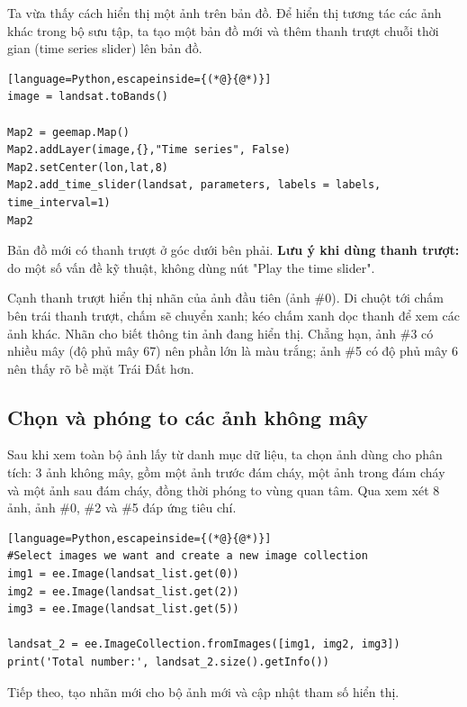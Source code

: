 Ta vừa thấy cách hiển thị một ảnh trên bản đồ. Để hiển thị tương tác các ảnh khác trong bộ sưu tập, ta tạo một bản đồ mới và thêm thanh trượt chuỗi thời gian (time series slider) lên bản đồ.

\begin{lstlisting}[language=Python,escapeinside={(*@}{@*)}]
image = landsat.toBands()

Map2 = geemap.Map()
Map2.addLayer(image,{},"Time series", False)
Map2.setCenter(lon,lat,8)
Map2.add_time_slider(landsat, parameters, labels = labels, time_interval=1)
Map2
\end{lstlisting}

Bản đồ mới có thanh trượt ở góc dưới bên phải. \textbf{Lưu ý khi dùng thanh trượt:} do một số vấn đề kỹ thuật, không dùng nút "Play the time slider".

Cạnh thanh trượt hiển thị nhãn của ảnh đầu tiên (ảnh \#0). Di chuột tới chấm bên trái thanh trượt, chấm sẽ chuyển xanh; kéo chấm xanh dọc thanh để xem các ảnh khác. Nhãn cho biết thông tin ảnh đang hiển thị. Chẳng hạn, ảnh \#3 có nhiều mây (độ phủ mây 67) nên phần lớn là màu trắng; ảnh \#5 có độ phủ mây 6 nên thấy rõ bề mặt Trái Đất hơn.

\subsection{Chọn và phóng to các ảnh không mây}

Sau khi xem toàn bộ ảnh lấy từ danh mục dữ liệu, ta chọn ảnh dùng cho phân tích: 3 ảnh không mây, gồm một ảnh trước đám cháy, một ảnh trong đám cháy và một ảnh sau đám cháy, đồng thời phóng to vùng quan tâm. Qua xem xét 8 ảnh, ảnh \#0, \#2 và \#5 đáp ứng tiêu chí.

\begin{lstlisting}[language=Python,escapeinside={(*@}{@*)}]
#Select images we want and create a new image collection
img1 = ee.Image(landsat_list.get(0))
img2 = ee.Image(landsat_list.get(2))
img3 = ee.Image(landsat_list.get(5))

landsat_2 = ee.ImageCollection.fromImages([img1, img2, img3])
print('Total number:', landsat_2.size().getInfo())
\end{lstlisting}

Tiếp theo, tạo nhãn mới cho bộ ảnh mới và cập nhật tham số hiển thị.

